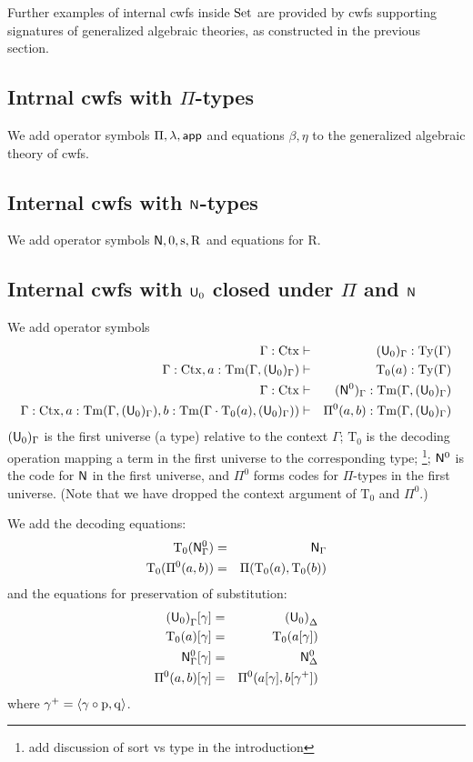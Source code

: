 \documentclass{lmcs}
\newcommand{\s}{\mathrm{s}}
\newcommand{\Rec}{\mathrm{R}}
\newcommand{\Ta}{\mathrm{T}}
\def\Ctx{\mathrm{Ctx}}
\begin{document}
Further examples of internal cwfs inside ${\rm Set}$ are provided by cwfs supporting signatures of generalized algebraic theories, as constructed in the previous section.

\subsection{Intrnal cwfs with $\Pi$-types} 
We add operator symbols $\Pi, \lambda, \mathsf{app}$ and equations $\beta, \eta$ to the generalized algebraic theory of cwfs. 

\subsection{Internal cwfs with $\mathsf{N}$-types} 
We add operator symbols $\N, 0, \s, \Rec$ and equations for $\Rec$.

\subsection{Internal cwfs with $\mathsf{U}_0$ closed under $\Pi$ and $\mathsf{N}$} 
We add operator symbols
\begin{eqnarray*}
\Gamma : \Ctx &\vdash& (\U_0)_\Gamma : \Ty(\Gamma)\\
\Gamma : \Ctx, a : \Tm(\Gamma,(\U_0)_\Gamma) &\vdash& {\Ta_0}(a) : \Ty(\Gamma)\\
\Gamma : \Ctx &\vdash& (\N^0)_\Gamma : \Tm(\Gamma,(\U_0)_\Gamma) \\
\Gamma : \Ctx, 
a : \Tm(\Gamma,(\U_0)_\Gamma), 
b :  \Tm(\Gamma \cdot \Ta_0(a), (\U_0)_\Gamma))
&\vdash&
 \Pi^0(a,b) : \Tm(\Gamma,(\U_0)_\Gamma)
\end{eqnarray*}
$(\mathsf{U}_0)_\Gamma$ is the first universe (a type) relative to the context $\Gamma$; $\Ta_0$ is the decoding operation mapping a term in the first universe to the corresponding type; \footnote{add discussion of sort vs type in the introduction}; $\mathsf{N}^0$ is the code for $\mathsf{N}$ in the first universe, and $\Pi^0$ forms codes for $\Pi$-types in the first universe. (Note that we have dropped the context argument of $\Ta_0$ and $\Pi^0$.)

We add the decoding equations:
\begin{eqnarray*}
\Ta_0(\N^0_\Gamma) &=& \N_\Gamma\\
\Ta_0(\Pi^0(a,b)) &=& \Pi(\Ta_0(a),\Ta_0(b))
\end{eqnarray*}
and the equations for preservation of substitution:
\begin{eqnarray*}
{(\U_0)}_\Gamma [ \gamma ] &=& {(\U_0)}_\Delta\\
\Ta_0(a) [ \gamma ] &=& \Ta_0(a[ \gamma ] )\\
\N^0_\Gamma [ \gamma ] &=&\N^0_\Delta\\
\Pi^0(a,b)[ \gamma ] &=& \Pi^0(a [ \gamma ], b[ \gamma^+ ])
\end{eqnarray*}
where $\gamma^+ = \langle \gamma \circ \mathrm{p}, \mathrm{q} \rangle$.
\end{document}
